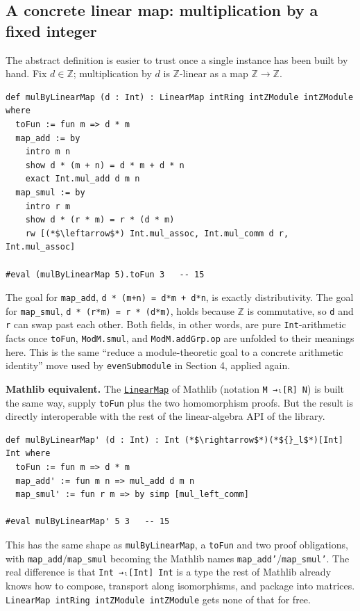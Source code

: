 \subsection{A concrete linear map: multiplication by a fixed integer}\label{sec:11-modules:05-linear-maps:4}

The abstract definition is easier to trust once a single instance has been built by hand. Fix \(d \in \mathbb{Z}\); multiplication by \(d\) is \(\mathbb{Z}\)-linear as a map \(\mathbb{Z} \to \mathbb{Z}\).

\begin{lstlisting}
def mulByLinearMap (d : Int) : LinearMap intRing intZModule intZModule where
  toFun := fun m => d * m
  map_add := by
    intro m n
    show d * (m + n) = d * m + d * n
    exact Int.mul_add d m n
  map_smul := by
    intro r m
    show d * (r * m) = r * (d * m)
    rw [(*$\leftarrow$*) Int.mul_assoc, Int.mul_comm d r, Int.mul_assoc]

#eval (mulByLinearMap 5).toFun 3   -- 15
\end{lstlisting}

The goal for \texttt{map\_\allowbreak{}add}, \texttt{d * (m+n) = d*m + d*n}, is exactly distributivity. The goal for \texttt{map\_\allowbreak{}smul}, \texttt{d * (r*m) = r * (d*m)}, holds because \(\mathbb{Z}\) is commutative, so \texttt{d} and \texttt{r} can swap past each other. Both fields, in other words, are pure \texttt{Int}-arithmetic facts once \texttt{toFun}, \texttt{ModM.smul}, and \texttt{ModM.addGrp.op} are unfolded to their meanings here. This is the same ``reduce a module-theoretic goal to a concrete arithmetic identity'' move used by \texttt{evenSubmodule} in Section 4, applied again.

\textbf{Mathlib equivalent.} The \href{https://loogle.lean-lang.org/?q=LinearMap}{\texttt{LinearMap}} of Mathlib (notation \texttt{M →ₗ[R] N}) is built the same way, supply \texttt{toFun} plus the two homomorphism proofs. But the result is directly interoperable with the rest of the linear-algebra API of the library.

\begin{lstlisting}
def mulByLinearMap' (d : Int) : Int (*$\rightarrow$*)(*${}_l$*)[Int] Int where
  toFun := fun m => d * m
  map_add' := fun m n => mul_add d m n
  map_smul' := fun r m => by simp [mul_left_comm]

#eval mulByLinearMap' 5 3   -- 15
\end{lstlisting}

This has the same shape as \texttt{mulByLinearMap}, a \texttt{toFun} and two proof obligations, with \texttt{map\_\allowbreak{}add}/\texttt{map\_\allowbreak{}smul} becoming the Mathlib names \texttt{map\_\allowbreak{}add'}/\texttt{map\_\allowbreak{}smul'}. The real difference is that \texttt{Int →ₗ[Int] Int} is a type the rest of Mathlib already knows how to compose, transport along isomorphisms, and package into matrices. \texttt{LinearMap intRing intZModule intZModule} gets none of that for free.
